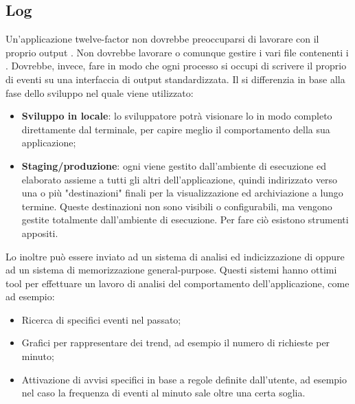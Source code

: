 \documentclass[NormeDiProgetto.tex]{subfiles}
\begin{document}
\subsection{Log}
Un'applicazione twelve-factor non dovrebbe preoccuparsi di lavorare con il proprio output . Non dovrebbe lavorare o comunque gestire i vari file contenenti i . Dovrebbe, invece, fare in modo che ogni processo si occupi di scrivere il proprio  di eventi su una interfaccia di output standardizzata.
Il  si differenzia in base alla fase dello sviluppo nel quale viene utilizzato:
\begin{itemize}
\item \textbf{Sviluppo in locale}: lo sviluppatore potrà visionare lo  in modo completo direttamente dal terminale, per capire meglio il comportamento della sua applicazione;
\item \textbf{Staging/produzione}: ogni  viene gestito dall'ambiente di esecuzione ed elaborato assieme a tutti gli altri  dell'applicazione, quindi indirizzato verso una o più "destinazioni" finali per la visualizzazione ed archiviazione a lungo termine. Queste destinazioni non sono visibili o configurabili, ma vengono gestite totalmente dall'ambiente di esecuzione. Per fare ciò esistono strumenti appositi.
\end{itemize}
Lo  inoltre può essere inviato ad un sistema di analisi ed indicizzazione di  oppure ad un sistema di memorizzazione general-purpose. Questi sistemi hanno ottimi tool per effettuare un lavoro di analisi del comportamento dell'applicazione, come ad esempio:
\begin{itemize}
\item Ricerca di specifici eventi nel passato;
\item Grafici per rappresentare dei trend, ad esempio il numero di richieste per minuto;
\item Attivazione di avvisi specifici in base a regole definite dall'utente, ad esempio nel caso la frequenza di eventi al minuto sale oltre una certa soglia.
\end{itemize}
\end{document}
